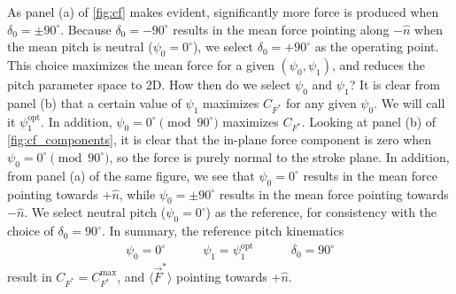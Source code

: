 \documentclass[11pt,letterpaper]{article}
\begin{document}
As panel (a) of \autoref{fig:cf} makes evident,
significantly more force is produced when
$\delta_0 = \pm90^\circ$. Because $\delta_0 = -90^\circ$
results in the mean force pointing along $-\hat{n}$
when the mean pitch is neutral ($\psi_0 = 0^\circ$),
we select $\delta_0 = +90^\circ$ as the operating point.
This choice maximizes the mean force for a given
$(\psi_0, \psi_1)$, and reduces the pitch parameter space to 2D.
How then do we select $\psi_0$ and $\psi_1$? It is
clear from panel (b) that a certain value of $\psi_1$
maximizes $C_{F^*}$ for any given $\psi_0$.
We will call it $\psi_1^\text{opt}$.
In addition, $\psi_0 = 0^\circ\pmod{90^\circ}$
maximizes $C_{F^*}$. Looking at panel (b) of \autoref{fig:cf_components},
it is clear that the in-plane force component is zero when
$\psi_0 = 0^\circ\pmod{90^\circ}$, so the force
is purely normal to the stroke plane. In addition,
from panel (a) of the same figure, we see that $\psi_0 = 0^\circ$
results in the mean force pointing towards $+\hat{n}$,
while $\psi_0 = \pm90^\circ$ results in the mean force
pointing towards $-\hat{n}$. We select neutral pitch
($\psi_0 = 0^\circ$) as the reference,
for consistency with the choice of $\delta_0 = 90^\circ$.
In summary, the reference pitch kinematics
\begin{align}
    \psi_0 = 0^\circ \quad\quad\quad \psi_1 = \psi_1^\text{opt} \quad\quad\quad \delta_0 = 90^\circ
\end{align}
result in $C_{F^*} = C_{F^*}^\text{max}$,
and $\langle \vec{F}^* \rangle$
pointing towards $+\hat{n}$.
\end{document}
